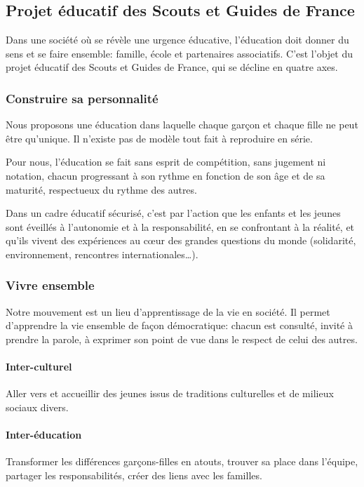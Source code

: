 \documentclass[titlepage,11pt,a4paper]{article}
\begin{document}
\clearpage
\subsection{\label{pesgdf}Projet éducatif des Scouts et Guides de France}

Dans une société où se révèle une urgence éducative, l’éducation doit donner du sens et se
faire ensemble: famille, école et partenaires associatifs. C’est l’objet du projet
éducatif des Scouts et Guides de France, qui se décline en quatre axes.

\subsubsection*{Construire sa personnalité}

Nous proposons une éducation dans laquelle chaque garçon et chaque fille ne peut être
qu’unique. Il n’existe pas de modèle tout fait à reproduire en série.

Pour nous, l’éducation se fait sans esprit de compétition, sans jugement ni notation,
chacun progressant à son rythme en fonction de son âge et de sa maturité, respectueux du
rythme des autres.

Dans un cadre éducatif sécurisé, c’est par l’action que les enfants et les jeunes sont
éveillés à l’autonomie et à la responsabilité, en se confrontant à la réalité, et qu’ils
vivent des expériences au cœur des grandes questions du monde (solidarité, environnement,
rencontres internationales…).

\subsubsection*{Vivre ensemble}

Notre mouvement est un lieu d’apprentissage de la vie en société. Il permet d’apprendre la
vie ensemble de façon démocratique: chacun est consulté, invité à prendre la parole, à
exprimer son point de vue dans le respect de celui des autres.

\paragraph{Inter-culturel} Aller vers et accueillir des jeunes issus de traditions culturelles et de
milieux sociaux divers.

\paragraph{Inter-éducation} Transformer les différences garçons-filles en atouts, trouver sa place
dans l’équipe, partager les responsabilités, créer des liens avec les familles.
\end{document}
